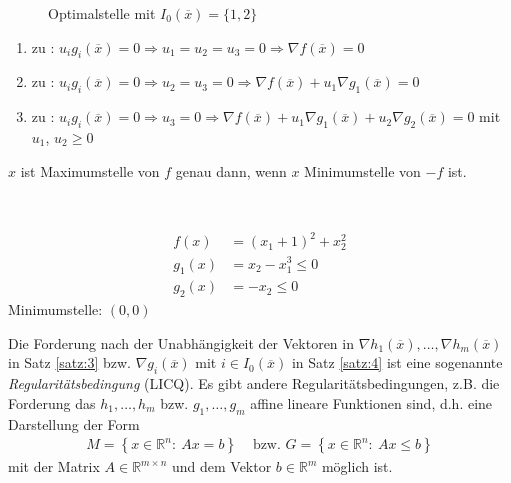 \begin{figure}[!htb]
	\centering
	
	\caption{Optimalstelle mit $I_0(\overline{x})=\{1,2\}$}
	\label{fig:kap_1_ktb_opt_1_2}
\end{figure}
\begin{enumerate}[label=\alph*)]
  \item zu : $u_ig_i(\overline{x})=0\Rightarrow u_1=u_2=u_3=0\Rightarrow \nabla f(\overline{x})=0$
  \item zu : $u_ig_i(\overline{x})=0\Rightarrow u_2=u_3=0\Rightarrow \nabla f(\overline{x})+u_1\nabla g_1(\overline{x})=0$
  \item zu : $u_ig_i(\overline{x})=0\Rightarrow u_3=0\Rightarrow \nabla f(\overline{x})+u_1\nabla g_1(\overline{x})+u_2\nabla g_2(\overline{x})=0$ mit
  $u_1$, $u_2\ge 0$\\
\end{enumerate}
\begin{remark}
	$x$ ist Maximumstelle von $f$ genau dann, wenn $x$ Minimumstelle von $-f$ ist.  
\end{remark} 
\begin{gegenexmp}\hspace{1cm}\\
\begin{minipage}{0.5\textwidth}
\begin{align*}
f(x) & = (x_1+1)^2+x^2_2\\
g_1(x) & = x_2-x^3_1 \le 0\\
g_2(x) & = -x_2 \le 0
\end{align*}
Minimumstelle: $(0,0)$
\end{minipage}
\begin{minipage}{0.5\textwidth}
\centering

\end{minipage}
\end{gegenexmp}
\begin{remark}
  Die Forderung nach der Unabhängigkeit der Vektoren in $\nabla h_1(\overline{x}),\ldots,\nabla h_m(\overline{x})$ in Satz \ref{satz:3} bzw. $\nabla g_i(\overline{x})$ mit
  $i\in I_0(\overline{x})$ in Satz \ref{satz:4} ist eine sogenannte \textit{Regularitätsbedingung} (\ac{LICQ}). Es gibt andere Regularitätsbedingungen, z.B. die Forderung das
  $h_1,\ldots,h_m$ bzw. $g_1,\ldots,g_m$ affine lineare Funktionen sind, d.h. eine Darstellung der Form 
  \begin{align*}
  	M = \left\{ x\in\mathbb{R}^n:\ Ax=b \right\} & \text{ bzw. } G=\left\{ x\in\mathbb{R}^n:\ Ax\le b \right\}
  \end{align*}
  mit der Matrix $A\in\mathbb{R}^{m\times n}$ und dem Vektor $b\in\mathbb{R}^m$ möglich ist.
\end{remark}
